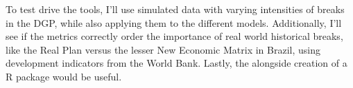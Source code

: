 \documentclass[11pt, a4paper]{article}
\begin{document}
To test drive the tools, I'll use simulated data with varying intensities of breaks in the DGP, while also applying them to the different models. Additionally, I'll see if the metrics correctly order the importance of real world historical breaks, like the Real Plan versus the lesser New Economic Matrix in Brazil, using development indicators from the World Bank. Lastly, the alongside creation of a R package would be useful.


\newpage
\printbibliography
\end{document}
